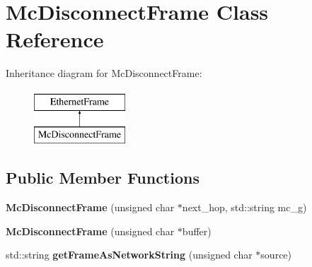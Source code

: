 \hypertarget{classMcDisconnectFrame}{\section{Mc\-Disconnect\-Frame Class Reference}
\label{classMcDisconnectFrame}
}
Inheritance diagram for Mc\-Disconnect\-Frame\-:\begin{figure}[H]
\begin{center}
\leavevmode
\includegraphics[height=2.000000cm]{classMcDisconnectFrame}
\end{center}
\end{figure}
\subsection*{Public Member Functions}
\begin{DoxyCompactItemize}
\item 
\hypertarget{classMcDisconnectFrame_a129496a0049d05790f8e9a3969424419}{{\bfseries Mc\-Disconnect\-Frame} (unsigned char $\ast$next\-\_\-hop, std\-::string mc\-\_\-g)}\label{classMcDisconnectFrame_a129496a0049d05790f8e9a3969424419}

\item 
\hypertarget{classMcDisconnectFrame_a0c9b7c332969140cc98f3fc6b89dca0a}{{\bfseries Mc\-Disconnect\-Frame} (unsigned char $\ast$buffer)}\label{classMcDisconnectFrame_a0c9b7c332969140cc98f3fc6b89dca0a}

\item 
\hypertarget{classMcDisconnectFrame_a8de8eef3be3247e6c49eba7ee8af774e}{std\-::string {\bfseries get\-Frame\-As\-Network\-String} (unsigned char $\ast$source)}\label{classMcDisconnectFrame_a8de8eef3be3247e6c49eba7ee8af774e}

\end{DoxyCompactItemize}
